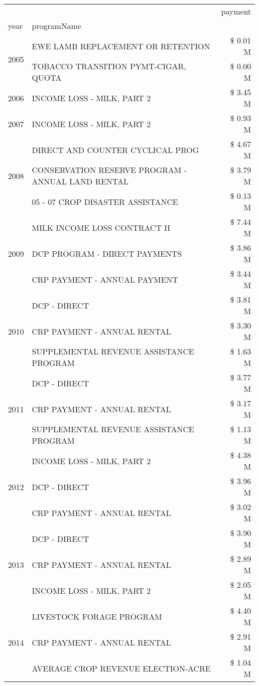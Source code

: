 \begin{tabular}{llr}
\toprule
 &  & payment \\
year & programName &  \\
\midrule
\multirow[t]{2}{*}{2005} & EWE LAMB REPLACEMENT OR RETENTION & \$ 0.01 M \\
 & TOBACCO TRANSITION PYMT-CIGAR, QUOTA & \$ 0.00 M \\
\cline{1-3}
2006 & INCOME LOSS - MILK, PART 2 & \$ 3.45 M \\
\cline{1-3}
2007 & INCOME LOSS - MILK, PART 2 & \$ 0.93 M \\
\cline{1-3}
\multirow[t]{3}{*}{2008} & DIRECT AND COUNTER CYCLICAL PROG & \$ 4.67 M \\
 & CONSERVATION RESERVE PROGRAM - ANNUAL LAND RENTAL & \$ 3.79 M \\
 & 05 - 07 CROP DISASTER ASSISTANCE & \$ 0.13 M \\
\cline{1-3}
\multirow[t]{3}{*}{2009} & MILK INCOME LOSS CONTRACT II & \$ 7.44 M \\
 & DCP PROGRAM - DIRECT PAYMENTS & \$ 3.86 M \\
 & CRP PAYMENT - ANNUAL PAYMENT & \$ 3.44 M \\
\cline{1-3}
\multirow[t]{3}{*}{2010} & DCP - DIRECT & \$ 3.81 M \\
 & CRP PAYMENT - ANNUAL RENTAL & \$ 3.30 M \\
 & SUPPLEMENTAL REVENUE ASSISTANCE PROGRAM & \$ 1.63 M \\
\cline{1-3}
\multirow[t]{3}{*}{2011} & DCP - DIRECT & \$ 3.77 M \\
 & CRP PAYMENT - ANNUAL RENTAL & \$ 3.17 M \\
 & SUPPLEMENTAL REVENUE ASSISTANCE PROGRAM & \$ 1.13 M \\
\cline{1-3}
\multirow[t]{3}{*}{2012} & INCOME LOSS - MILK, PART 2 & \$ 4.38 M \\
 & DCP - DIRECT & \$ 3.96 M \\
 & CRP PAYMENT - ANNUAL RENTAL & \$ 3.02 M \\
\cline{1-3}
\multirow[t]{3}{*}{2013} & DCP - DIRECT & \$ 3.90 M \\
 & CRP PAYMENT - ANNUAL RENTAL & \$ 2.89 M \\
 & INCOME LOSS - MILK, PART 2 & \$ 2.05 M \\
\cline{1-3}
\multirow[t]{3}{*}{2014} & LIVESTOCK FORAGE PROGRAM & \$ 4.40 M \\
 & CRP PAYMENT - ANNUAL RENTAL & \$ 2.91 M \\
 & AVERAGE CROP REVENUE ELECTION-ACRE & \$ 1.04 M \\

\end{tabular}

